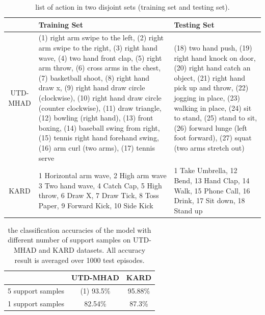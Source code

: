 \documentclass{bmvc2k}
\begin{document}
\begin{table}[htb]
	\begin{center}
		\begin{tabular}{|c|p{4.8cm}|p{4cm}|}
			
			\hline
			& Training Set  & Testing Set \\
			\hline\hline
			UTD-MHAD & (1) right arm swipe to the left, (2) right arm swipe to the right, (3) right hand wave, (4) two hand front clap, (5) right arm throw, (6) cross arms in the chest, (7) basketball shoot, (8) right hand draw x, (9) right hand draw circle (clockwise), (10) right hand draw circle (counter clockwise), (11) draw triangle, (12) bowling (right hand), (13) front boxing, (14) baseball swing from right, (15) tennis right hand forehand swing, (16) arm curl (two arms), (17) tennis serve & (18) two hand push, (19) right hand knock on door, (20) right hand catch an object, (21) right hand pick up and throw, (22) jogging in place, (23) walking in place, (24) sit to stand, (25) stand to sit, (26) forward lunge (left foot forward), (27) squat (two arms stretch out)\\
			\hline
			KARD & 1 Horizontal arm wave, 2 High arm wave
			3 Two hand wave, 4 Catch Cap, 5 High throw, 6 Draw X, 7 Draw Tick, 8 Toss Paper, 9 Forward Kick, 10 Side Kick
			& 1 Take Umbrella, 12 Bend, 13 Hand Clap, 14 Walk, 15 Phone Call, 16 Drink, 17 Sit down, 18 Stand up \\
			\hline
		\end{tabular}	
	\end{center}
	\caption{ list of action in two disjoint sets (training set and testing set). }	
	\label{tab:3}
\end{table}
\begin{table}[htbp]
	\begin{center}	
		\begin{tabular}{|c|c|c|}
			\hline
			& UTD-MHAD & KARD\\
			\hline\hline
			5 support samples & (1) 93.5\% & 95.88\% \\
			1 support samples & 82.54\%
			& 87.3\%\\
			\hline
		\end{tabular}	
	\end{center}
	\caption{ the classification accuracies of the model with different number of support samples on UTD-MHAD and KARD datasets. All accuracy result is averaged over 1000 test episodes. }	
	\label{tab:4}
\end{table}
\end{document}
